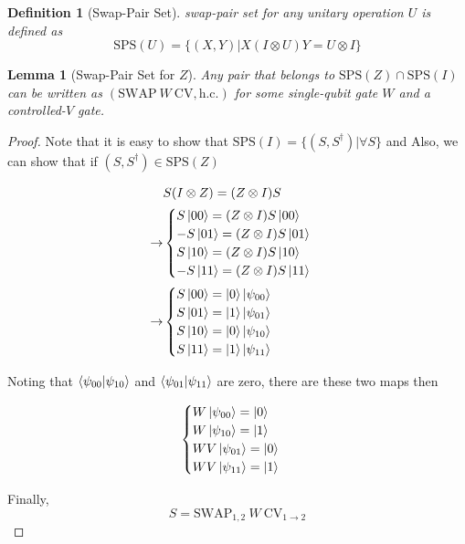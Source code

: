 \documentclass{report}
\newtheorem{definition}{Definition}
\newtheorem{lemma}{Lemma}
\begin{document}
\begin{definition}[Swap-Pair Set]
  swap-pair set for any unitary operation $U$ is defined as
  \begin{equation}
    \mathrm{SPS}(U) = \{ (X, Y) | X(I \otimes U)Y = U \otimes I \}
  \end{equation}
\end{definition}


\begin{lemma}[Swap-Pair Set for $Z$]
  Any pair that belongs to $\mathrm{SPS}(Z) \cap \mathrm{SPS}(I)$ 
  can be written as $(\mathrm{SWAP} ~ W ~ \mathrm{CV}, \text{h.c.})$ for some single-qubit gate $W$ and a controlled-$V$ gate.
\end{lemma}
\begin{proof}
Note that it is easy to show that $\mathrm{SPS}(I) = \{ (S, S^\dagger) | \forall S \}$ and 
Also, we can show that if $(S, S^\dagger) \in \mathrm{SPS}(Z)$

\begin{equation}
  \begin{aligned}
  &S(I \otimes Z) = (Z \otimes I) S \\
  \rightarrow &\begin{cases}
    S\ket{00} = (Z \otimes I) S\ket{00} \\
    - S\ket{01} = (Z \otimes I) S\ket{01} \\
    S\ket{10} = (Z \otimes I) S\ket{10} \\
    - S\ket{11} = (Z \otimes I) S\ket{11}
  \end{cases} \\
  \rightarrow &\begin{cases}
    S\ket{00} = \ket{0}\ket{\psi_{00}} \\
    S\ket{01} = \ket{1}\ket{\psi_{01}} \\
    S\ket{10} = \ket{0}\ket{\psi_{10}} \\
    S\ket{11} = \ket{1}\ket{\psi_{11}}
  \end{cases} \\
  \end{aligned}
\end{equation}

Noting that $\braket{\psi_{00}}{\psi_{10}}$ and $\braket{\psi_{01}}{\psi_{11}}$ are zero, there are these two maps then

\begin{equation}
  \begin{cases}
  W\ket{\psi_{00}} = \ket{0} \\
  W\ket{\psi_{10}} = \ket{1} \\
  WV\ket{\psi_{01}} = \ket{0} \\
  WV\ket{\psi_{11}} = \ket{1}
  \end{cases}
\end{equation}

Finally, 
\begin{equation}
  S = \mathrm{SWAP}_{1,2} ~ W ~ \mathrm{CV}_{1\to 2}
\end{equation}
\end{proof}
\end{document}
